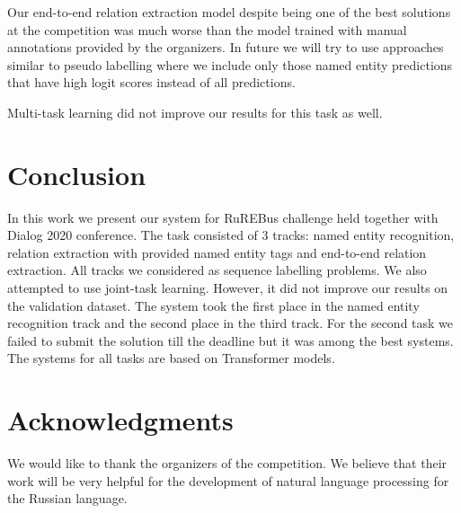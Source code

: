 \documentclass{dialogue}
\begin{document}
	Our end-to-end relation extraction model despite being one of the best solutions at the competition was much worse than the model trained with manual annotations provided by the organizers. In future we will try to use approaches similar to pseudo labelling where we include only those named entity predictions that have high logit scores instead of all predictions.
	
	Multi-task learning did not improve our results for this task as well. 
	\section{Conclusion}
	In this work we present our system for RuREBus challenge held together with Dialog 2020 conference. The task consisted of 3 tracks: named entity recognition, relation extraction with provided named entity tags and end-to-end relation extraction. All tracks we considered as sequence labelling problems. We also attempted to use joint-task learning. However, it did not improve our results on the validation dataset. The system took the first place in the named entity recognition track and the second place in the third track. For the second task we failed to submit the solution till the deadline but it was among the best systems. The systems for all tasks are based on Transformer models.
	
	\section{Acknowledgments}
	We would like to thank the organizers of the competition. We believe that their work will be very helpful for the development of natural language processing for the Russian language.
	
	
	
\end{document}
